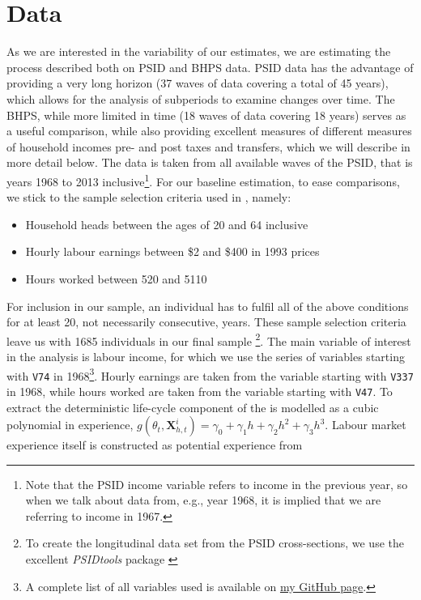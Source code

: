 \section{Data}
As we are interested in the variability of our estimates, we are estimating the
process described both on PSID and BHPS data. PSID data has the advantage of
providing a very long horizon (37 waves of data covering a total of 45 years),
which allows for the analysis of subperiods to examine changes over time. The
BHPS, while more limited in time (18 waves of data covering 18 years) serves as
a useful comparison, while also providing excellent measures of different
measures of household incomes pre- and post taxes and transfers, which we will
describe in more detail below. 
The data is taken from all available waves of the PSID, that is years 1968 to
2013 inclusive\footnote{Note that the PSID income variable refers to income in
the previous year, so when we talk about data from, e.g., year 1968, it is
implied that we are referring to income in 1967.}. For our baseline estimation,
to ease comparisons, we stick to the sample selection criteria used in
\citet{Guvenen2009}, namely:
\begin{itemize}
	\item Household heads between the ages of 20 and 64 inclusive
    \item Hourly labour earnings between \$2 and \$400 in 1993 prices
    \item Hours worked between 520 and 5110
\end{itemize}
For inclusion in our sample, an individual has to fulfil all of the above
conditions for at least 20, not necessarily consecutive, years. These sample
selection criteria leave us with 1685 individuals in our final sample
\footnote{To create the longitudinal data set from the PSID cross-sections, we
use the excellent \textit{PSIDtools} package \citep{Kohler2015}}. The main
variable of interest in the analysis is labour income, for which we use the
series of variables starting with \texttt{V74} in 1968\footnote{A complete list
of all variables used is available on
\href{https://github.com/nilshg/psidJulia/blob/master/create_panel.do}{my GitHub
page}.}. Hourly earnings are taken from the variable starting with \texttt{V337}
in 1968, while hours worked are taken from the variable starting with
\texttt{V47}. To extract the deterministic life-cycle component of the is 
modelled as a cubic polynomial in experience,
$g(\theta_t, \pmb{X}_{h,t}^i) = \gamma_0 + \gamma_1 h + \gamma_2 h^2 + \gamma_3 h^3$.
Labour market experience itself is constructed as potential experience from 
